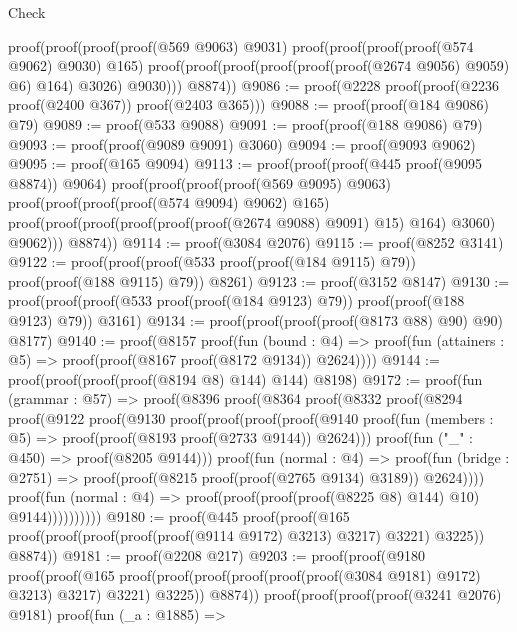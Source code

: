 \begin{lexlean}{Check}
\begin{coremodule}
      proof(proof(proof(proof(@569 @9063) @9031)
            proof(proof(proof(proof(@574 @9062) @9030) @165)
                proof(proof(proof(proof(proof(proof(@2674 @9056) @9059) @6) @164) @3026) @9030)))
          @8874))
@9086 := proof(@2228 proof(proof(@2236 proof(@2400 @367)) proof(@2403 @365)))
@9088 := proof(proof(@184 @9086) @79)
@9089 := proof(@533 @9088)
@9091 := proof(proof(@188 @9086) @79)
@9093 := proof(proof(@9089 @9091) @3060)
@9094 := proof(@9093 @9062)
@9095 := proof(@165 @9094)
@9113 := proof(proof(proof(@445 proof(@9095 @8874)) @9064)
      proof(proof(proof(proof(@569 @9095) @9063)
            proof(proof(proof(proof(@574 @9094) @9062) @165)
                proof(proof(proof(proof(proof(proof(@2674 @9088) @9091) @15) @164) @3060) @9062)))
          @8874))
@9114 := proof(@3084 @2076)
@9115 := proof(@8252 @3141)
@9122 := proof(proof(proof(@533 proof(proof(@184 @9115) @79)) proof(proof(@188 @9115) @79)) @8261)
@9123 := proof(@3152 @8147)
@9130 := proof(proof(proof(@533 proof(proof(@184 @9123) @79)) proof(proof(@188 @9123) @79)) @3161)
@9134 := proof(proof(proof(proof(@8173 @88) @90) @90) @8177)
@9140 := proof(@8157
      proof(fun (bound : @4) =>
        proof(fun (attainers : @5) => proof(proof(@8167 proof(@8172 @9134)) @2624))))
@9144 := proof(proof(proof(proof(@8194 @8) @144) @144) @8198)
@9172 := proof(fun (grammar : @57) =>
    proof(@8396
        proof(@8364
            proof(@8332
                proof(@8294
                    proof(@9122
                        proof(@9130
                            proof(proof(proof(proof(@9140
                                      proof(fun (members : @5) =>
                                        proof(proof(@8193 proof(@2733 @9144)) @2624)))
                                    proof(fun ("_" : @450) => proof(@8205 @9144)))
                                  proof(fun (normal : @4) =>
                                    proof(fun (bridge : @2751) =>
                                      proof(proof(@8215 proof(proof(@2765 @9134) @3189)) @2624))))
                                proof(fun (normal : @4) =>
                                  proof(proof(proof(proof(@8225 @8) @144) @10) @9144))))))))))
@9180 := proof(@445
      proof(proof(@165 proof(proof(proof(proof(proof(@9114 @9172) @3213) @3217) @3221) @3225))
          @8874))
@9181 := proof(@2208 @217)
@9203 := proof(proof(@9180
        proof(proof(@165
              proof(proof(proof(proof(proof(proof(@3084 @9181) @9172) @3213) @3217) @3221) @3225))
            @8874))
      proof(proof(proof(proof(@3241 @2076) @9181)
            proof(fun (_a : @1885) =>

\end{coremodule}
\end{lexlean}
